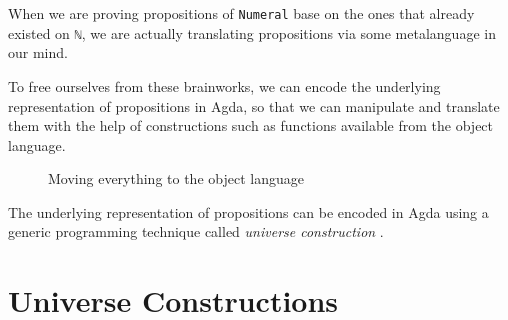 \documentclass[\main/thesis.tex]{subfiles}
\begin{document}
When we are proving propositions of \lstinline|Numeral| base on the ones that
already existed on \lstinline|ℕ|, we are actually translating propositions via
some metalanguage in our mind.

To free ourselves from these brainworks, we can encode the
underlying representation of propositions in Agda,
so that we can manipulate and translate them with the
help of constructions such as functions available from the object language.

\begin{figure}[H]
    \centering
    \begin{adjustbox}{max width=\textwidth}
    \end{adjustbox}
\caption{Moving everything to the object language}
\label{figure:38}
\end{figure}

The underlying representation of propositions can be encoded in Agda
using a generic programming technique called \textit{universe construction}
\cite{norell2009dependently}.

\section{Universe Constructions}
\end{document}
